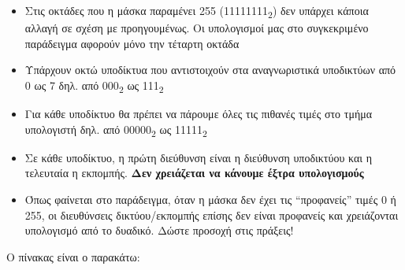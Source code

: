 \begin{itemize}
\item Στις οκτάδες που η μάσκα παραμένει 255 (11111111\textsubscript{2}) δεν υπάρχει κάποια αλλαγή σε σχέση με προηγουμένως. Οι υπολογισμοί μας στο συγκεκριμένο παράδειγμα αφορούν μόνο την τέταρτη οκτάδα
\item Υπάρχουν οκτώ υποδίκτυα που αντιστοιχούν στα αναγνωριστικά υποδικτύων από 0 ως 7 δηλ. από 000\textsubscript{2} ως 111\textsubscript{2}
\item Για κάθε υποδίκτυο θα πρέπει να πάρουμε όλες τις πιθανές τιμές στο τμήμα υπολογιστή δηλ. από 00000\textsubscript{2} ως 11111\textsubscript{2}
\item Σε κάθε υποδίκτυο, η πρώτη διεύθυνση είναι η διεύθυνση υποδικτύου και η τελευταία η εκπομπής. \textbf{Δεν χρειάζεται να κάνουμε έξτρα υπολογισμούς}
\item Όπως φαίνεται στο παράδειγμα, όταν η μάσκα δεν έχει τις ``προφανείς'' τιμές 0 ή 255, οι διευθύνσεις δικτύου/εκπομπής επίσης δεν είναι προφανείς και χρειάζονται υπολογισμό από το δυαδικό. Δώστε προσοχή στις πράξεις! 
\end{itemize}

Ο πίνακας είναι ο παρακάτω:


